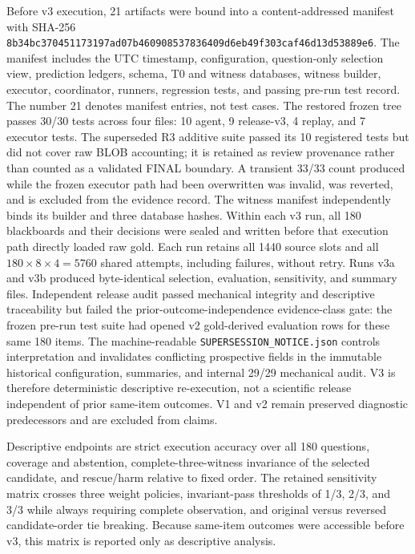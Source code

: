 \documentclass[applsci,article,submit,moreauthors]{Definitions/mdpi}
\begin{document}
Before v3 execution, 21 artifacts were bound into a content-addressed manifest with SHA-256 \texttt{8b34bc370451173197ad07b460908537836409d6eb49f303caf46d13d53889e6}. The manifest includes the UTC timestamp, configuration, question-only selection view, prediction ledgers, schema, T0 and witness databases, witness builder, executor, coordinator, runners, regression tests, and passing pre-run test record. The number 21 denotes manifest entries, not test cases. The restored frozen tree passes 30/30 tests across four files: 10 agent, 9 release-v3, 4 replay, and 7 executor tests. The superseded R3 additive suite passed its 10 registered tests but did not cover raw BLOB accounting; it is retained as review provenance rather than counted as a validated FINAL boundary. A transient 33/33 count produced while the frozen executor path had been overwritten was invalid, was reverted, and is excluded from the evidence record. The witness manifest independently binds its builder and three database hashes. Within each v3 run, all 180 blackboards and their decisions were sealed and written before that execution path directly loaded raw gold. Each run retains all 1440 source slots and all $180\times8\times4=5760$ shared attempts, including failures, without retry. Runs v3a and v3b produced byte-identical selection, evaluation, sensitivity, and summary files. Independent release audit passed mechanical integrity and descriptive traceability but failed the prior-outcome-independence evidence-class gate: the frozen pre-run test suite had opened v2 gold-derived evaluation rows for these same 180 items. The machine-readable \texttt{SUPERSESSION\_NOTICE.json} controls interpretation and invalidates conflicting prospective fields in the immutable historical configuration, summaries, and internal 29/29 mechanical audit. V3 is therefore deterministic descriptive re-execution, not a scientific release independent of prior same-item outcomes. V1 and v2 remain preserved diagnostic predecessors and are excluded from claims.

Descriptive endpoints are strict execution accuracy over all 180 questions, coverage and abstention, complete-three-witness invariance of the selected candidate, and rescue/harm relative to fixed order. The retained sensitivity matrix crosses three weight policies, invariant-pass thresholds of 1/3, 2/3, and 3/3 while always requiring complete observation, and original versus reversed candidate-order tie breaking. Because same-item outcomes were accessible before v3, this matrix is reported only as descriptive analysis.
\end{document}
